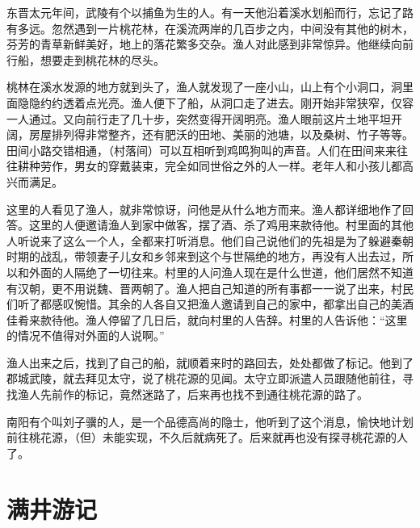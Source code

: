 \documentclass[12pt,UTF-8,openany]{ctexbook}
\begin{document}
\begin{normalsize}
    
    东晋太元年间，武陵有个以捕鱼为生的人。有一天他沿着溪水划船而行，忘记了路有多远。忽然遇到一片桃花林，在溪流两岸的几百步之内，中间没有其他的树木， 芬芳的青草新鲜美好，地上的落花繁多交杂。渔人对此感到非常惊异。他继续向前行船，想要走到桃花林的尽头。
    
    桃林在溪水发源的地方就到头了，渔人就发现了一座小山，山上有个小洞口，洞里面隐隐约约透着点光亮。渔人便下了船，从洞口走了进去。刚开始非常狭窄，仅容一人通过。又向前行走了几十步，突然变得开阔明亮。渔人眼前这片土地平坦开阔，房屋排列得非常整齐，还有肥沃的田地、美丽的池塘，以及桑树、竹子等等。田间小路交错相通，（村落间）可以互相听到鸡鸣狗叫的声音。人们在田间来来往往耕种劳作，男女的穿戴装束，完全如同世俗之外的人一样。老年人和小孩儿都高兴而满足。
    
    这里的人看见了渔人，就非常惊讶，问他是从什么地方而来。渔人都详细地作了回答。这里的人便邀请渔人到家中做客，摆了酒、杀了鸡用来款待他。村里面的其他人听说来了这么一个人，全都来打听消息。他们自己说他们的先祖是为了躲避秦朝时期的战乱，带领妻子儿女和乡邻来到这个与世隔绝的地方，再没有人出去过，所以和外面的人隔绝了一切往来。村里的人问渔人现在是什么世道，他们居然不知道有汉朝，更不用说魏、晋两朝了。渔人把自己知道的所有事都一一说了出来，村民们听了都感叹惋惜。其余的人各自又把渔人邀请到自己的家中，都拿出自己的美酒佳肴来款待他。渔人停留了几日后，就向村里的人告辞。村里的人告诉他：“这里的情况不值得对外面的人说啊。”
    
    渔人出来之后，找到了自己的船，就顺着来时的路回去，处处都做了标记。他到了郡城武陵，就去拜见太守，说了桃花源的见闻。太守立即派遣人员跟随他前往，寻找渔人先前作的标记，竟然迷路了，后来再也找不到通往桃花源的路了。
    
    南阳有个叫刘子骥的人，是一个品德高尚的隐士，他听到了这个消息，愉快地计划前往桃花源，（但）未能实现，不久后就病死了。后来就再也没有探寻桃花源的人了。
    
\end{normalsize}



\chapter{满井游记}
\end{document}

